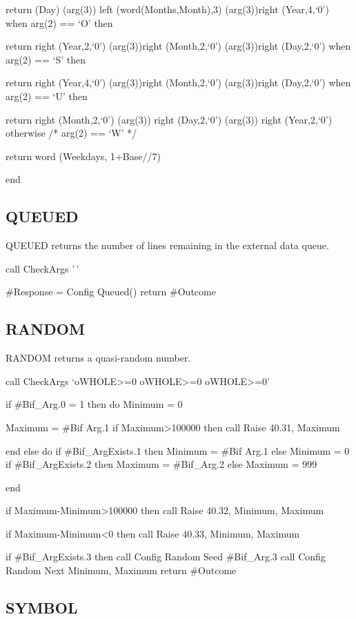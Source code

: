 return (Day) (arg(3)) left (word(Months,Month),3) (arg(3))right
(Year,4,`0') when arg(2) == `O' then

return right (Year,2,`0') (arg(3))right (Month,2,`0') (arg(3))right
(Day,2,`0') when arg(2) == `S' then

return right (Year,4,`0') (arg(3))right (Month,2,`0') (arg(3))right
(Day,2,`0') when arg(2) == `U' then

return right (Month,2,`0') (arg(3)) right (Day,2,`0') (arg(3)) right
(Year,2,`0') otherwise /* arg(2) == `W' */

return word (Weekdays, 1+Base//7)

end

\hypertarget{queued}{%
\subsection{QUEUED}\label{queued}}

QUEUED returns the number of lines remaining in the external data queue.

call CheckArgs '\,'

\#Response = Config Queued() return \#Outcome

\hypertarget{random}{%
\subsection{RANDOM}\label{random}}

RANDOM returns a quasi-random number.

call CheckArgs `oWHOLE\textgreater=0 oWHOLE\textgreater=0
oWHOLE\textgreater=0'

if \#Bif\_Arg.0 = 1 then do Minimum = 0

Maximum = \#Bif Arg.1 if Maximum\textgreater100000 then call Raise
40.31, Maximum

end else do if \#Bif\_ArgExists.1 then Minimum = \#Bif Arg.1 else
Minimum = 0 if \#Bif\_ArgExists.2 then Maximum = \#Bif\_Arg.2 else
Maximum = 999

end

if Maximum-Minimum\textgreater100000 then call Raise 40.32, Minimum,
Maximum

if Maximum-Minimum\textless0 then call Raise 40.33, Minimum, Maximum

if \#Bif\_ArgExists.3 then call Config Random Seed \#Bif\_Arg.3 call
Config Random Next Minimum, Maximum return \#Outcome

\hypertarget{symbol}{%
\subsection{SYMBOL}\label{symbol}}

